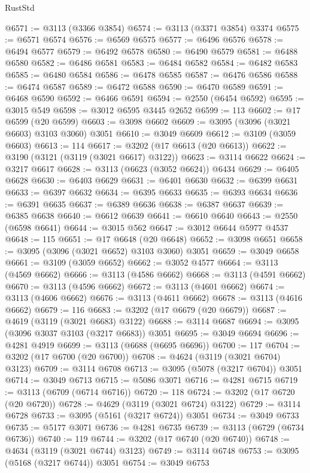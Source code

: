 \begin{lexlean}{RustStd}
\begin{coremodule}
@6571 := @3113 (@3366 @3854)
@6574 := @3113 (@3371 @3854) @3374
@6575 := @6571 @6574
@6576 := @6569 @6575
@6577 := @6496 @6576
@6578 := @6494 @6577
@6579 := @6492 @6578
@6580 := @6490 @6579
@6581 := @6488 @6580
@6582 := @6486 @6581
@6583 := @6484 @6582
@6584 := @6482 @6583
@6585 := @6480 @6584
@6586 := @6478 @6585
@6587 := @6476 @6586
@6588 := @6474 @6587
@6589 := @6472 @6588
@6590 := @6470 @6589
@6591 := @6468 @6590
@6592 := @6466 @6591
@6594 := @2550 (@6454 @6592)
@6595 := @3015 @549
@6598 := @3012 @6595 @3445 @2652
@6599 := 113
@6602 := @17 @6599 (@20 @6599)
@6603 := @3098 @6602
@6609 := @3095 (@3096 (@3021 @6603) @3103 @3060) @3051
@6610 := @3049 @6609
@6612 := @3109 (@3059 @6603)
@6613 := 114
@6617 := @3202 (@17 @6613 (@20 @6613))
@6622 := @3190 (@3121 (@3119 (@3021 @6617) @3122))
@6623 := @3114 @6622
@6624 := @3217 @6617
@6628 := @3113 (@6623 (@3052 @6624)) @6434
@6629 := @6405 @6628
@6630 := @6403 @6629
@6631 := @6401 @6630
@6632 := @6399 @6631
@6633 := @6397 @6632
@6634 := @6395 @6633
@6635 := @6393 @6634
@6636 := @6391 @6635
@6637 := @6389 @6636
@6638 := @6387 @6637
@6639 := @6385 @6638
@6640 := @6612 @6639
@6641 := @6610 @6640
@6643 := @2550 (@6598 @6641)
@6644 := @3015 @562
@6647 := @3012 @6644 @5977 @4537
@6648 := 115
@6651 := @17 @6648 (@20 @6648)
@6652 := @3098 @6651
@6658 := @3095 (@3096 (@3021 @6652) @3103 @3060) @3051
@6659 := @3049 @6658
@6661 := @3109 (@3059 @6652)
@6662 := @3052 @4577
@6664 := @3113 (@4569 @6662)
@6666 := @3113 (@4586 @6662)
@6668 := @3113 (@4591 @6662)
@6670 := @3113 (@4596 @6662)
@6672 := @3113 (@4601 @6662)
@6674 := @3113 (@4606 @6662)
@6676 := @3113 (@4611 @6662)
@6678 := @3113 (@4616 @6662)
@6679 := 116
@6683 := @3202 (@17 @6679 (@20 @6679))
@6687 := @4619 (@3119 (@3021 @6683) @3122)
@6688 := @3114 @6687
@6694 := @3095 (@3096 @3037 @3103 (@3217 @6683)) @3051
@6695 := @3049 @6694
@6696 := @4281 @4919
@6699 := @3113 (@6688 (@6695 @6696))
@6700 := 117
@6704 := @3202 (@17 @6700 (@20 @6700))
@6708 := @4624 (@3119 (@3021 @6704) @3123)
@6709 := @3114 @6708
@6713 := @3095 (@5078 (@3217 @6704)) @3051
@6714 := @3049 @6713
@6715 := @5086 @3071
@6716 := @4281 @6715
@6719 := @3113 (@6709 (@6714 @6716))
@6720 := 118
@6724 := @3202 (@17 @6720 (@20 @6720))
@6728 := @4629 (@3119 (@3021 @6724) @3122)
@6729 := @3114 @6728
@6733 := @3095 (@5161 (@3217 @6724)) @3051
@6734 := @3049 @6733
@6735 := @5177 @3071
@6736 := @4281 @6735
@6739 := @3113 (@6729 (@6734 @6736))
@6740 := 119
@6744 := @3202 (@17 @6740 (@20 @6740))
@6748 := @4634 (@3119 (@3021 @6744) @3123)
@6749 := @3114 @6748
@6753 := @3095 (@5168 (@3217 @6744)) @3051
@6754 := @3049 @6753

\end{coremodule}
\end{lexlean}
